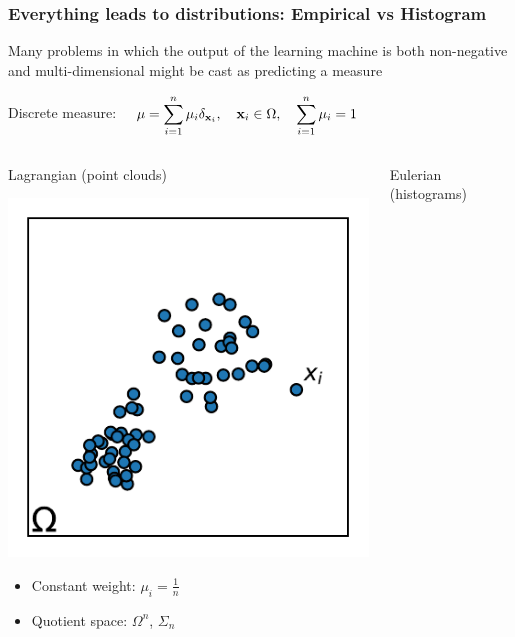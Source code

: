\documentclass[french,9pt]{beamer}
\newcommand{\x}{{\bf x}}
\begin{document}
\begin{frame}
\frametitle{Everything leads to distributions: Empirical vs Histogram}

Many problems in which the output of the learning machine is both non-negative and multi-dimensional might be cast as predicting a measure

\normalsize\vspace{3mm}
Discrete measure: $\quad\displaystyle \mu=\sum_{i=1}^n \mu_i\delta_{\x_i},\quad
\x_i\in\Omega,\quad \sum_{i=1}^n \mu_i=1$
\begin{columns}[t]
\begin{column}{.45\linewidth}
\begin{block}{Lagrangian (point clouds)}\vspace{-3mm}
\begin{center}
\includegraphics[width=.7\linewidth]{fig/distrib_empirical.pdf}
\end{center}\vspace{-5mm}
\begin{itemize}
\item Constant weight: $\mu_i=\frac{1}{n}$
\item Quotient space: $\Omega^n$, $\Sigma_n$ 
\end{itemize}
\end{block}
\end{column}
\begin{column}{.45\linewidth}
\begin{block}{Eulerian (histograms)}\vspace{-3mm}
\begin{center}

\end{center}
\end{block}
\end{column}
\end{columns}
\end{frame}
\end{document}
